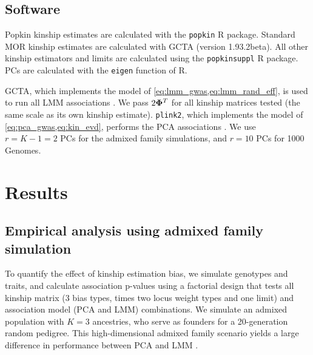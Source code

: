 \documentclass[11pt]{article}
\newcommand{\kinMat}[1][T]{%
  \ensuremath{%
    \mathbf{\Phi}^{#1}
  }%
  \xspace%
}%
\begin{document}
\begin{linenumbers}
\subsection{Software}

Popkin kinship estimates are calculated with the \texttt{popkin} R package.
Standard MOR kinship estimates are calculated with GCTA (version 1.93.2beta).
All other kinship estimators and limits are calculated using the \texttt{popkinsuppl} R package.
PCs are calculated with the \texttt{eigen} function of R.

GCTA, which implements the model of \cref{eq:lmm_gwas,eq:lmm_rand_eff}, is used to run all LMM associations \citep{yang_gcta:_2011, yang_advantages_2014}.
We pass $2 \kinMat$ for all kinship matrices tested (the same scale as its own kinship estimate).
\texttt{plink2}, which implements the model of \cref{eq:pca_gwas,eq:kin_evd}, performs the PCA associations \citep{chang_second-generation_2015}.
We use $r = K - 1 = 2$ PCs for the admixed family simulations, and $r = 10$ PCs for 1000 Genomes.

\section{Results}

\subsection{Empirical analysis using admixed family simulation}

To quantify the effect of kinship estimation bias, we simulate genotypes and traits, and calculate association p-values using a factorial design that tests all kinship matrix (3 bias types, times two locus weight types and one limit) and association model (PCA and LMM) combinations.
We simulate an admixed population with $K=3$ ancestries, who serve as founders for a 20-generation random pedigree.
This high-dimensional admixed family scenario yields a large difference in performance between PCA and LMM \citep{yao_limitations_2022}.


\end{linenumbers}
\end{document}
